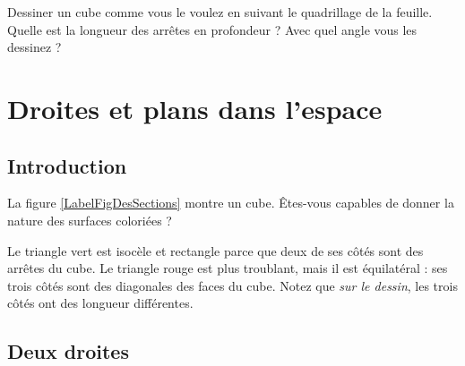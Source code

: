 

\begin{example}
    Dessiner un cube comme vous le voulez en suivant le quadrillage de la feuille. Quelle est la longueur des arrêtes en profondeur ? Avec quel angle vous les dessinez ?
\end{example}

\section{Droites et plans dans l'espace}

\subsection{Introduction}

La figure \ref{LabelFigDesSections} montre un cube. Êtes-vous capables de donner la nature des surfaces coloriées ?
\newcommand{\CaptionFigDesSections}{Exercice de vision dans l'espace.}

Le triangle vert est isocèle et rectangle parce que deux de ses côtés sont des arrêtes du cube. Le triangle rouge est plus troublant, mais il est équilatéral : ses trois côtés sont des diagonales des faces du cube. Notez que \emph{sur le dessin}, les trois côtés ont des longueur différentes.


\subsection{Deux droites}

